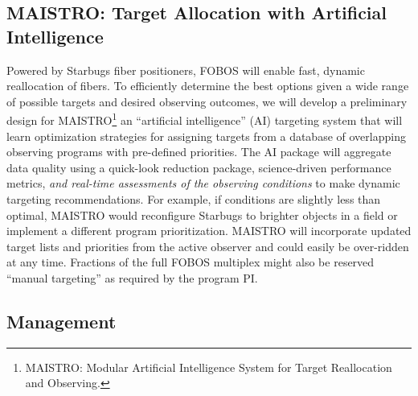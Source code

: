 \documentclass[oneside,11pt]{amsart}
\begin{document}
\subsection{MAISTRO: Target Allocation with Artificial Intelligence}
\label{sec:targeting}

Powered by Starbugs fiber positioners, FOBOS will enable fast, dynamic
reallocation of fibers.  To efficiently determine the best options given
a wide range of possible targets and desired observing outcomes, we will
develop a preliminary design for MAISTRO\footnote{MAISTRO: Modular
Artificial Intelligence System for Target Reallocation and Observing.}
an ``artificial intelligence'' (AI) targeting system that will learn
optimization strategies for assigning targets from a database of
overlapping observing programs with pre-defined priorities.  The AI
package will aggregate data quality using a quick-look reduction
package, science-driven performance metrics, {\it and real-time
assessments of the observing conditions} to make dynamic targeting
recommendations.  For example, if conditions are slightly less than
optimal, MAISTRO would reconfigure Starbugs to brighter objects in a
field or implement a different program prioritization.  MAISTRO will
incorporate updated target lists and priorities from the active observer
and could easily be over-ridden at any time.   Fractions of the full
FOBOS multiplex might also be reserved ``manual targeting'' as required
by the program PI.  









\subsection{Management}
\end{document}
